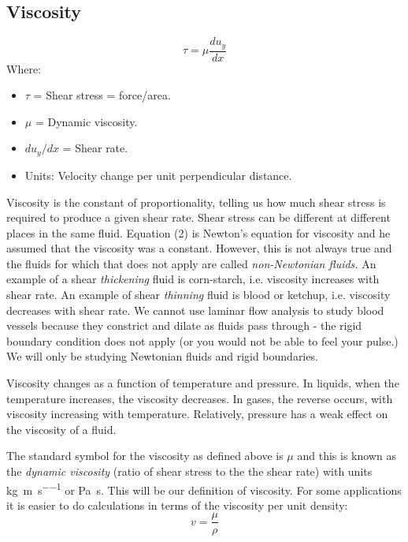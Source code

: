 \documentclass[class=report, crop=false, 12pt,a4paper]{standalone}
\numberwithin{equation}{section}
\begin{document}
\subsection{Viscosity}
\begin{equation}
  \tau = \mu \frac{du_y}{dx}
\end{equation}
Where:
\begin{multicols}{2}
  \begin{itemize}[noitemsep]
    \item \(\tau \) = Shear stress = force/area.
    \item \(\mu \) = Dynamic viscosity.
    \item \( du_y / dx \) = Shear rate.
    \item Units: Velocity change per unit perpendicular distance.
  \end{itemize}
\end{multicols}
Viscosity is the constant of proportionality, telling us how much shear stress is required to produce a given shear rate. Shear stress can be different at different places in the same fluid. Equation (2) is Newton's equation for viscosity and he assumed that the viscosity was a constant. However, this is not always true and the fluids for which that does not apply are called \emph{non-Newtonian fluids.} An example of a shear \emph{thickening} fluid is corn-starch, i.e. viscosity increases with shear rate. An example of shear \emph{thinning} fluid is blood or ketchup, i.e. viscosity decreases with shear rate. We cannot use laminar flow analysis to study blood vessels because they constrict and dilate as fluids pass through - the rigid boundary condition does not apply (or you would not be able to feel your pulse.) We will only be studying Newtonian fluids and rigid boundaries.

Viscosity changes as a function of temperature and pressure. In liquids, when the temperature increases, the viscosity decreases. In gases, the reverse occurs, with viscosity increasing with temperature. Relatively, pressure has a weak effect on the viscosity of a fluid.

The standard symbol for the viscosity as defined above is \( \mu \) and this is known as the \emph{dynamic viscosity} (ratio of shear stress to the the shear rate) with units \si{\kg\per\meter\per\second} or \si{\pascal \second}. This will be our definition of viscosity. For some applications it is easier to do calculations in terms of the viscosity per unit density:
\begin{equation}
  v = \frac{\mu}{\rho}
\end{equation}
\end{document}
